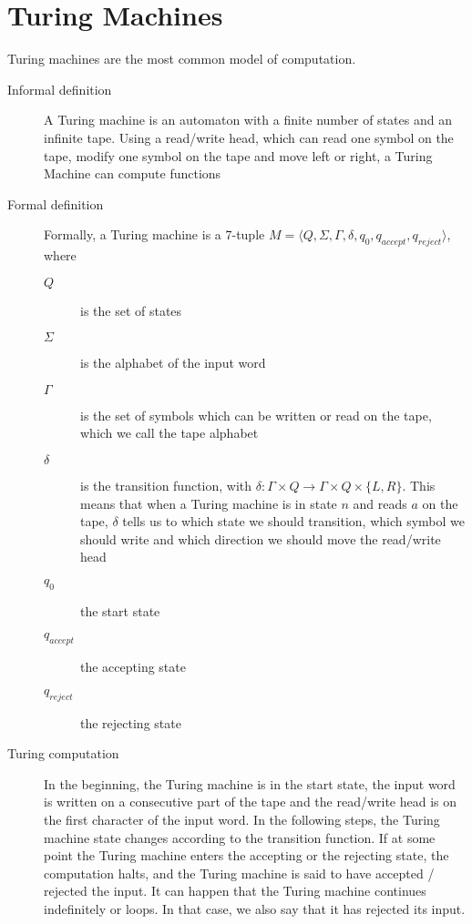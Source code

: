 \section{Turing Machines}\label{sec:turing-machines}
Turing machines are the most common model of computation.
\begin{description}
    \item[Informal definition] A Turing machine is an automaton with a finite number of states and an infinite tape.
    Using a read/write head, which can read one symbol on the tape, modify one symbol on the tape and move left or right, a Turing Machine can compute functions
    \item[Formal definition] Formally, a Turing machine is a 7-tuple $M = \langle  Q, \Sigma, \Gamma, \delta, q_0, q_{accept}, q_{reject}\rangle$, where
    \begin{description}
        \item[$Q$] is the set of states
        \item[$\Sigma$] is the alphabet of the input word
        \item[$\Gamma$] is the set of symbols which can be written or read on the tape, which we call the tape alphabet
        \item[$\delta$] is the transition function, with $\delta : \Gamma \times Q \to \Gamma \times Q \times \{L, R\}$.
        This means that when a Turing machine is in state $n$ and reads $a$ on the tape, $\delta$ tells us to which state we should transition, which symbol we should write and which direction we should move the read/write head
        \item[$q_0$] the start state
        \item[$q_{accept}$] the accepting state
        \item[$q_{reject}$] the rejecting state
    \end{description}
    \item[Turing computation] In the beginning, the Turing machine is in the start state, the input word is written on a consecutive part of the tape and the read/write head is on the first character of the input word.
    In the following steps, the Turing machine state changes according to the transition function.
    If at some point the Turing machine enters the accepting or the rejecting state, the computation halts, and the Turing machine is said to have accepted / rejected the input.
    It can happen that the Turing machine continues indefinitely or loops.
    In that case, we also say that it has rejected its input.

\end{description}
